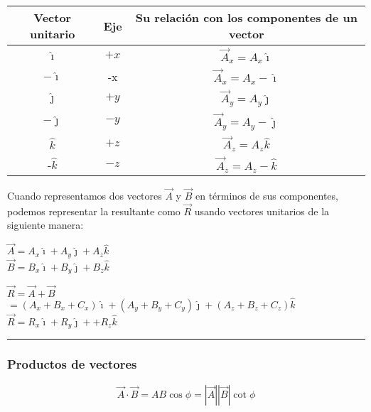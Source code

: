 \documentclass[
]{article}
\begin{document}
\begin{longtable}[]{@{}ccc@{}}
\toprule()
Vector unitario & Eje & Su relación con los componentes de un vector \\
\midrule()
\endhead
{\(\hat{\imath}\)} & {\(+ x\)} &
{\({\overset{\rightarrow}{A}}_{x} = A_{x}\hat{\imath}\)} \\
{\(- \hat{\imath}\)} & -x &
{\({\overset{\rightarrow}{A}}_{x} = A_{x} - \hat{\imath}\)} \\
{\(\hat{\jmath}\)} & {\(+ y\)} &
{\({\overset{\rightarrow}{A}}_{y} = A_{y}\hat{\jmath}\)} \\
{\(- \hat{\jmath}\)} & {\(- y\)} &
{\({\overset{\rightarrow}{A}}_{y} = A_{y} - \hat{\jmath}\)} \\
{\(\hat{k}\)} & {\(+ z\)} &
{\({\overset{\rightarrow}{A}}_{z} = A_{z}\hat{k}\)} \\
-{\(\hat{k}\)} & {\(- z\)} &
{\({\overset{\rightarrow}{A}}_{z} = A_{z} - \hat{k}\)} \\
\bottomrule()
\end{longtable}

Cuando representamos dos vectores {\(\overset{\rightarrow}{A}\)} y
{\(\overset{\rightarrow}{B}\)} en términos de sus componentes, podemos
representar la resultante como {\(\overset{\rightarrow}{R}\)} usando
vectores unitarios de la siguiente manera:

{\(\overset{\rightarrow}{A} = A_{x}\hat{\imath} + A_{y}\hat{\jmath} + A_{z}\hat{k}\)}\\
{\(\overset{\rightarrow}{B} = B_{x}\hat{\imath} + B_{y}\hat{\jmath} + B_{z}\hat{k}\)}

{\(\overset{\rightarrow}{R} = \overset{\rightarrow}{A} + \overset{\rightarrow}{B}\)}\\
{\(= (A_{x} + B_{x} + C_{x})\hat{\imath} + (A_{y} + B_{y} + C_{y})\hat{\jmath} + (A_{z} + B_{z} + C_{z})\hat{k}\)}\\
{\(\overset{\rightarrow}{R} = R_{x}\hat{\imath} + R_{y}\hat{\jmath} + + R_{z}\hat{k}\)}

\begin{center}\rule{0.5\linewidth}{0.5pt}\end{center}

\hypertarget{productos-de-vectores}{%
\subsubsection{Productos de vectores}\label{productos-de-vectores}}

{\[\overset{\rightarrow}{A} \cdot \overset{\rightarrow}{B} = AB\cos\phi = |\overset{\rightarrow}{A}||\overset{\rightarrow}{B}|\cot\phi\]}
\end{document}

